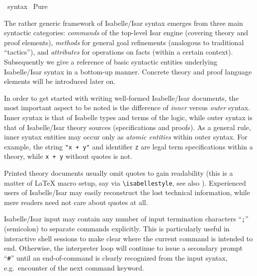 %
\begin{isabellebody}%
\def\isabellecontext{syntax}%
%
\isadelimtheory
\isanewline
\isanewline
%
\endisadelimtheory
%
\isatagtheory
{}\isamarkupfalse%
\ {\isachardoublequoteopen}syntax{\isachardoublequoteclose}\isanewline
{}\ Pure\isanewline
{}%
\endisatagtheory
{\isafoldtheory}%
%
\isadelimtheory
%
\endisadelimtheory
%
\isamarkuptrue%
%
\begin{isamarkuptext}%
The rather generic framework of Isabelle/Isar syntax emerges from
  three main syntactic categories: \emph{commands} of the top-level
  Isar engine (covering theory and proof elements), \emph{methods} for
  general goal refinements (analogous to traditional ``tactics''), and
  \emph{attributes} for operations on facts (within a certain
  context).  Subsequently we give a reference of basic syntactic
  entities underlying Isabelle/Isar syntax in a bottom-up manner.
  Concrete theory and proof language elements will be introduced later
  on.

  \medskip In order to get started with writing well-formed
  Isabelle/Isar documents, the most important aspect to be noted is
  the difference of \emph{inner} versus \emph{outer} syntax.  Inner
  syntax is that of Isabelle types and terms of the logic, while outer
  syntax is that of Isabelle/Isar theory sources (specifications and
  proofs).  As a general rule, inner syntax entities may occur only as
  \emph{atomic entities} within outer syntax.  For example, the string
  \verb|"x + y"| and identifier \verb|z| are legal term
  specifications within a theory, while \verb|x + y| without
  quotes is not.

  Printed theory documents usually omit quotes to gain readability
  (this is a matter of {\LaTeX} macro setup, say via \verb|\isabellestyle|, see also \cite{isabelle-sys}).  Experienced
  users of Isabelle/Isar may easily reconstruct the lost technical
  information, while mere readers need not care about quotes at all.

  \medskip Isabelle/Isar input may contain any number of input
  termination characters ``\verb|;|'' (semicolon) to separate
  commands explicitly.  This is particularly useful in interactive
  shell sessions to make clear where the current command is intended
  to end.  Otherwise, the interpreter loop will continue to issue a
  secondary prompt ``\verb|#|'' until an end-of-command is
  clearly recognized from the input syntax, e.g.\ encounter of the
  next command keyword.


\end{isamarkuptext}
\end{isabellebody}
